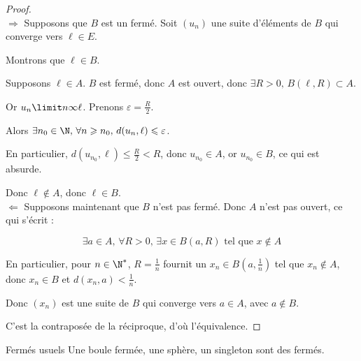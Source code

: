 
\begin{proof}~\\
    $\Rightarrow$ Supposons que $B$ est un fermé.
    Soit $(u_n)$ une suite d'éléments de $B$ qui converge vers $\ell \in E$.

    Montrons que $\ell \in B$.

    Supposons $\ell \in A$. $B$ est fermé, donc $A$ est ouvert, donc $\exists R > 0, \, B(\ell, R) \subset A$.

    Or $u_n \limit n \infty \ell$. Prenons $\varepsilon = \frac R 2$. 

    Alors $\exists n_0 \in \N, \, \forall n \geqslant n_0, \, d(u_{n}, \ell) \leqslant \varepsilon$. 

    En particulier, $d(u_{n_0}, \ell) \leqslant \frac R 2 < R$, donc $u_{n_0} \in A$, or $u_{n_0} \in B$, ce qui est absurde.

    Donc $\ell \not \in A$, donc $\ell \in B$. \\

    $\Leftarrow$ Supposons maintenant que $B$ n'est pas fermé. Donc $A$ n'est pas ouvert, ce qui s'écrit : 

    $$\exists a \in A, \, \forall R > 0, \, \exists x \in B(a, R) \text{ tel que } x \not \in A$$

    En particulier, pour $n \in \N^*$, $R = \frac 1 n$ fournit un $x_n \in B(a, \frac 1 n)$ tel que $x_n \not \in A$, donc $x_n \in B$ 
    et $d(x_n, a) < \frac 1 n$.

    Donc $(x_n)$ est une suite de $B$ qui converge vers $a \in A$, avec $a \not \in B$.

    C'est la contraposée de la réciproque, d'où l'équivalence. 
\end{proof}


\begin{proposition}{Fermés usuels}{}
    Une boule fermée, une sphère, un singleton sont des fermés. 
\end{proposition}



